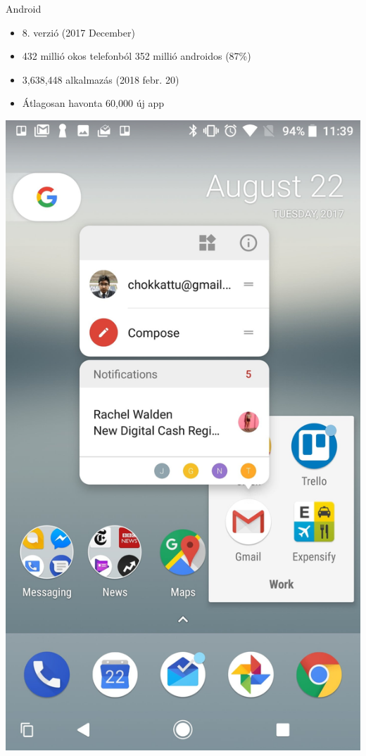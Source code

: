 \documentclass{beamer}
\begin{document}
\begin{frame}[fragile]{Android}
	\begin{minipage}{0.49\textwidth}
		\begin{itemize}
			\item 8. verzió (2017 December)
			\item 432 millió okos telefonból 352 millió androidos (87\%)
			\item 3,638,448 alkalmazás (2018 febr. 20)
			\item Átlagosan havonta 60,000 új app
		\end{itemize}
	\end{minipage}
	\begin{minipage}{.49\textwidth}
		\includegraphics[width=.8\linewidth]{figures/android80.jpg}
	\end{minipage}
\end{frame}
\end{document}
